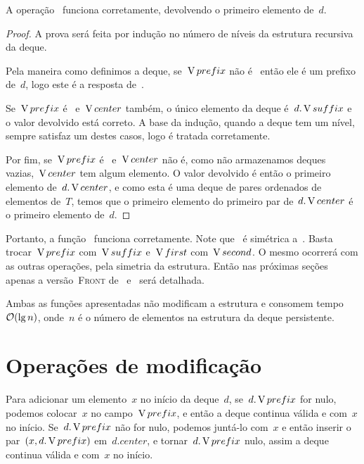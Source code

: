 \documentclass[main.tex]{subfiles}
\begin{document}
\begin{proposition}
A operação~ funciona corretamente, devolvendo o primeiro elemento de~$d$.
\end{proposition}

\begin{proof}
A prova será feita por indução no número de níveis da estrutura recursiva da deque.

Pela maneira como definimos a deque, se~$\operatorname{V}{prefix}$ não é~ então ele é um prefixo de~$d$, logo este é a resposta de~.

Se~$\operatorname{V}{prefix}$ é~ e~$\operatorname{V}{center}$ também, o único elemento da deque é~$d.\operatorname{V}{suffix}$ e o valor devolvido está correto. A base da indução, quando a deque tem um nível, sempre satisfaz um destes casos, logo é tratada corretamente.

Por fim, se~$\operatorname{V}{prefix}$ é~ e~$\operatorname{V}{center}$ não é, como não armazenamos deques vazias,~$\operatorname{V}{center}$ tem algum elemento. O valor devolvido é então o primeiro elemento de~$d.\operatorname{V}{center}$, e como esta é uma deque de pares ordenados de elementos de~$T$, temos que o primeiro elemento do primeiro par de~$d.\operatorname{V}{center}$ é o primeiro elemento de~$d$.
\end{proof}

Portanto, a função~ funciona corretamente.
Note que~ é simétrica a~. Basta trocar~$\operatorname{V}{prefix}$ com~$\operatorname{V}{suffix}$ e~$\operatorname{V}{first}$ com~$\operatorname{V}{second}$. O mesmo ocorrerá com as outras operações, pela simetria da estrutura. Então nas próximas seções apenas a versão~\textsc{Front} de~ e~ será detalhada.

Ambas as funções apresentadas não modificam a estrutura e consomem tempo~$\mathcal{O}(\lg n)$, onde~$n$ é o número de elementos na estrutura da deque persistente.

\section{Operações de modificação}

Para adicionar um elemento~$x$ no início da deque~$d$, se~$d.\operatorname{V}{prefix}$ for nulo, podemos colocar~$x$ no campo~$\operatorname{V}{prefix}$, e então a deque continua válida e com~$x$ no início. Se~$d.\operatorname{V}{prefix}$ não for nulo, podemos juntá-lo com~$x$ e então inserir o par~$(x, d.\operatorname{V}{prefix})$ em~$d.center$, e tornar~$d.\operatorname{V}{prefix}$ nulo, assim a deque continua válida e com~$x$ no início.
\end{document}
